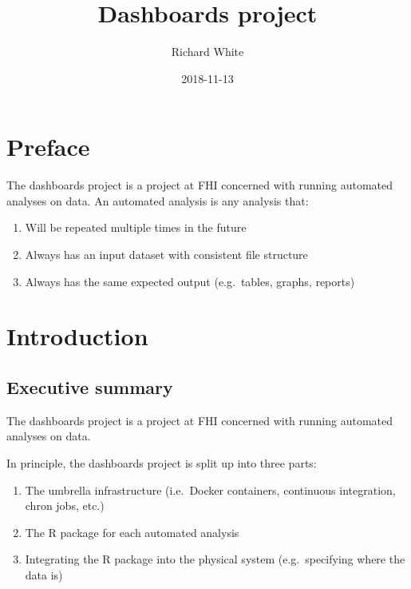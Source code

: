 \documentclass[12pt,]{article}
\title{Dashboards project}
\author{Richard White}
\date{2018-11-13}
\providecommand{\tightlist}{%
  \setlength{\itemsep}{0pt}\setlength{\parskip}{0pt}}
\theoremstyle{definition}
\theoremstyle{definition}
\theoremstyle{definition}
\theoremstyle{remark}
\begin{document}
\maketitle

{
\hypersetup{linkcolor=black}
\setcounter{tocdepth}{2}
\tableofcontents
}
\listoftables
\listoffigures
\section*{Preface}\label{preface}

The dashboards project is a project at FHI concerned with running
automated analyses on data. An automated analysis is any analysis that:

\begin{enumerate}
\def\labelenumi{\arabic{enumi}.}
\tightlist
\item
  Will be repeated multiple times in the future
\item
  Always has an input dataset with consistent file structure
\item
  Always has the same expected output (e.g.~tables, graphs, reports)
\end{enumerate}

\section{Introduction}\label{introduction}

\subsection{Executive summary}\label{executive-summary}

The dashboards project is a project at FHI concerned with running
automated analyses on data.

In principle, the dashboards project is split up into three parts:

\begin{enumerate}
\def\labelenumi{\arabic{enumi}.}
\tightlist
\item
  The umbrella infrastructure (i.e.~Docker containers, continuous
  integration, chron jobs, etc.)
\item
  The R package for each automated analysis
\item
  Integrating the R package into the physical system (e.g.~specifying
  where the data is)
\end{enumerate}
\end{document}
